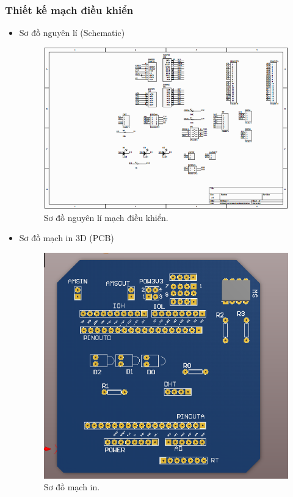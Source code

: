 \documentclass[a4paper,12pt,oneside]{article}
\begin{document}
\subsubsection{Thiết kế mạch điều khiển}
\begin{itemize}
\item Sơ đồ nguyên lí (Schematic)
\begin{figure}[H]
\begin{center}
\includegraphics[scale=0.8]{hinh/schematic.png}
\end{center}
\caption{Sơ đồ nguyên lí mạch điều khiển.}
\end{figure}
\newpage
\item Sơ đồ mạch in 3D (PCB)
\begin{figure}[H]
\begin{center}
\includegraphics[scale=0.8]{hinh/pcb.png}
\end{center}
\caption{Sơ đồ mạch in.}
\end{figure}
\end{itemize}
\end{document}
